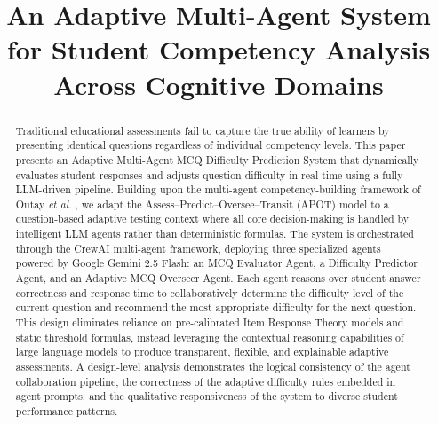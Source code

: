 \documentclass[conference]{IEEEtran}
\begin{document}
\title{An Adaptive Multi-Agent System for Student
Competency Analysis Across Cognitive Domains}

\author{
\and
{}
\and
{}
}

\maketitle

\begin{abstract}
Traditional educational assessments fail to capture the true ability of learners by presenting identical questions regardless of individual competency levels. This paper presents an Adaptive Multi-Agent MCQ Difficulty Prediction System that dynamically evaluates student responses and adjusts question difficulty in real time using a fully LLM-driven pipeline. Building upon the multi-agent competency-building framework of Outay \textit{et al.} \cite{outay2024}, we adapt the Assess--Predict--Oversee--Transit (APOT) model to a question-based adaptive testing context where all core decision-making is handled by intelligent LLM agents rather than deterministic formulas. The system is orchestrated through the CrewAI multi-agent framework, deploying three specialized agents powered by Google Gemini 2.5 Flash: an MCQ Evaluator Agent, a Difficulty Predictor Agent, and an Adaptive MCQ Overseer Agent. Each agent reasons over student answer correctness and response time to collaboratively determine the difficulty level of the current question and recommend the most appropriate difficulty for the next question. This design eliminates reliance on pre-calibrated Item Response Theory models and static threshold formulas, instead leveraging the contextual reasoning capabilities of large language models to produce transparent, flexible, and explainable adaptive assessments. A design-level analysis demonstrates the logical consistency of the agent collaboration pipeline, the correctness of the adaptive difficulty rules embedded in agent prompts, and the qualitative responsiveness of the system to diverse student performance patterns.
\end{abstract}
\end{document}
